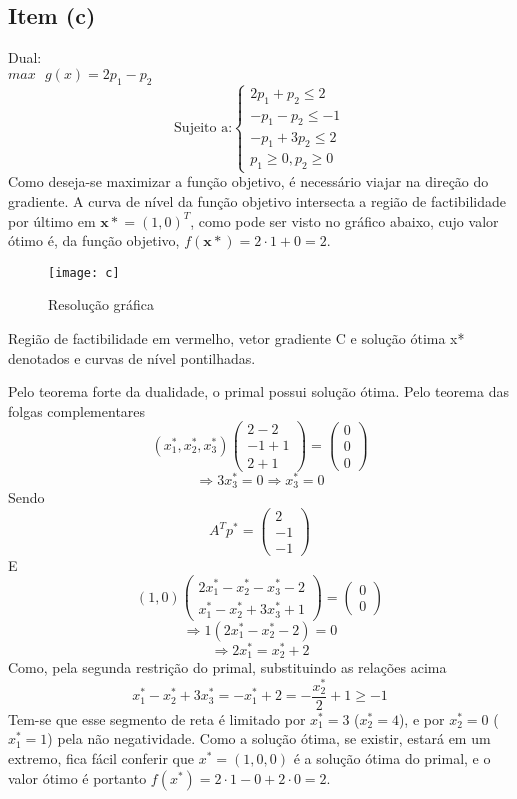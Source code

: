 \documentclass[a4paper, 12pt]{article}
\begin{document}
\subsection{Item (c)}
Dual:\\
$max\text{ }g(x)=2p_1-p_2$
\[
\text{Sujeito a:}\left\{
\begin{array}{l}
2p_1+p_2\leq2\\
-p_1-p_2\leq-1\\
-p_1+3p_2\leq2\\
p_1\geq 0, p_2\geq 0
\end{array}
\right.
\]
Como deseja-se maximizar a função objetivo, é necessário viajar na direção do gradiente. A curva de nível da função objetivo intersecta a região de factibilidade por último em $\mathbf{x*}=(1,0)^T$, como pode ser visto no gráfico abaixo, cujo valor ótimo é, da função objetivo, $f(\mathbf{x*})=2\cdot 1+0=2$.
\begin{table}[H]
\centering
\begin{figure}[H]
    \centering
    \caption{\label{fig:1} Resolução gráfica}
    \texttt{[image: c]}
\end{figure}
\small
Região de factibilidade em vermelho, vetor gradiente C e solução ótima x* denotados e curvas de nível pontilhadas.
\end{table}
Pelo teorema forte da dualidade, o primal possui solução ótima. Pelo teorema das folgas complementares
\[
(x_1^*,x_2^*,x_3^*)
\begin{pmatrix}
2-2\\
-1+1\\
2+1
\end{pmatrix}
=
\begin{pmatrix}
0\\
0\\
0
\end{pmatrix}
\]
\[
\Rightarrow 3x_3^*=0\Rightarrow x_3^*=0
\]
Sendo
\[
A^Tp^*=
\begin{pmatrix}
2\\
-1\\
-1
\end{pmatrix}
\]
E
\[
(1,0)
\begin{pmatrix}
2x_1^*-x_2^*-x_3^*-2\\
x_1^*-x_2^*+3x_3^*+1
\end{pmatrix}
=
\begin{pmatrix}
0\\
0
\end{pmatrix}
\]
\[
\Rightarrow 1(2x_1^*-x_2^*-2)=0 
\]
\[
\Rightarrow 2x_1^*=x_2^*+2
\]
Como, pela segunda restrição do primal, substituindo as relações acima
\[
x_1^* − x_2^* + 3x_3^*=-x_1^*+2=-\frac{x_2^*}{2}+1\geq-1
\] 
Tem-se que esse segmento de reta é limitado por $x_1^*=3$ ($x_2^*=4$), e por $x_2^*=0$ ($x_1^*=1$) pela não negatividade. Como a solução ótima, se existir, estará em um extremo, fica fácil conferir que $x^*=(1,0,0)$ é a solução ótima do primal, e o valor ótimo é portanto $f(x^*)=2\cdot 1-0+2\cdot 0=2$.
\end{document}
